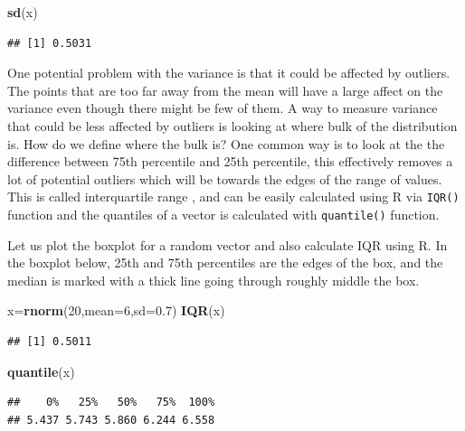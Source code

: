 \documentclass[12pt,]{krantz}
\newenvironment{Shaded}{\begin{snugshade}}{\end{snugshade}}
\newcommand{\DataTypeTok}[1]{\textcolor[rgb]{0.13,0.29,0.53}{#1}}
\newcommand{\DecValTok}[1]{\textcolor[rgb]{0.00,0.00,0.81}{#1}}
\newcommand{\FloatTok}[1]{\textcolor[rgb]{0.00,0.00,0.81}{#1}}
\newcommand{\KeywordTok}[1]{\textcolor[rgb]{0.13,0.29,0.53}{\textbf{#1}}}
\newcommand{\NormalTok}[1]{#1}
\begin{document}
\begin{Shaded}
\begin{Highlighting}[]
\KeywordTok{sd}\NormalTok{(x)}
\end{Highlighting}
\end{Shaded}

\begin{verbatim}
## [1] 0.5031
\end{verbatim}

One potential problem with the variance is that it could be affected by
outliers. The points that are too far away from the mean will have a large
affect on the variance even though there might be few of them.
A way to measure variance that could be less affected by outliers is
looking at where bulk of the distribution is. How do we define where the bulk is?
One common way is to look at the the difference between 75th percentile and 25th
percentile, this effectively removes a lot of potential outliers which will be
towards the edges of the range of values.
This is called interquartile range , and
can be easily calculated using R via \texttt{IQR()} function and the quantiles of a vector
is calculated with \texttt{quantile()} function.

Let us plot the boxplot for a random vector and also calculate IQR using R.
In the boxplot below, 25th and 75th percentiles are the edges of the box, and
the median is marked with a thick line going through roughly middle the box.

\begin{Shaded}
\begin{Highlighting}[]
\NormalTok{x=}\KeywordTok{rnorm}\NormalTok{(}\DecValTok{20}\NormalTok{,}\DataTypeTok{mean=}\DecValTok{6}\NormalTok{,}\DataTypeTok{sd=}\FloatTok{0.7}\NormalTok{)}
\KeywordTok{IQR}\NormalTok{(x)}
\end{Highlighting}
\end{Shaded}

\begin{verbatim}
## [1] 0.5011
\end{verbatim}

\begin{Shaded}
\begin{Highlighting}[]
\KeywordTok{quantile}\NormalTok{(x)}
\end{Highlighting}
\end{Shaded}

\begin{verbatim}
##    0%   25%   50%   75%  100% 
## 5.437 5.743 5.860 6.244 6.558
\end{verbatim}
\end{document}
